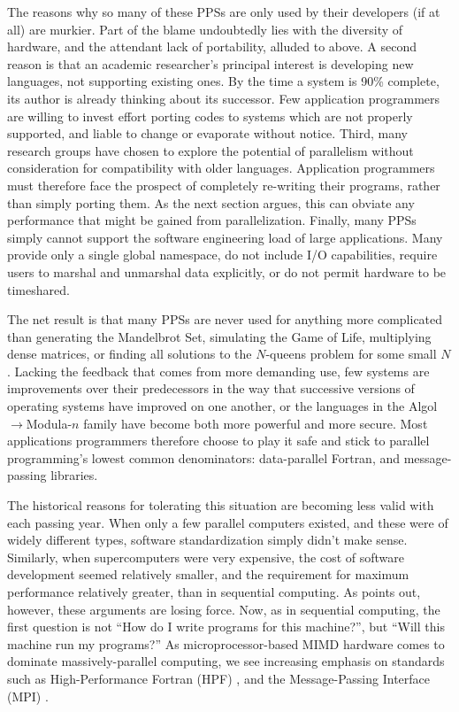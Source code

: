 The reasons why so many of these PPSs are only used by their developers (if at all) are murkier.
Part of the blame undoubtedly lies with the diversity of hardware,
and the attendant lack of portability,
alluded to above.
A second reason is that an academic researcher's principal interest is developing new languages,
not supporting existing ones.
By the time a system is 90\% complete,
its author is already thinking about its successor.
Few application programmers are willing to invest effort porting codes
to systems which are not properly supported,
and liable to change or evaporate without notice.
Third,
many research groups have chosen to explore the potential of parallelism
without consideration for compatibility with older languages.
Application programmers must therefore face the prospect of completely re-writing their programs,
rather than simply porting them.
As the next section argues,
this can obviate any performance that might be gained from parallelization.
Finally,
many PPSs simply cannot support the software engineering load of large applications.
Many provide only a single global namespace,
do not include I/O capabilities,
require users to marshal and unmarshal data explicitly,
or do not permit hardware to be timeshared.

The net result is that many PPSs are never used for anything more complicated than
generating the Mandelbrot Set,
simulating the Game of Life,
multiplying dense matrices,
or finding all solutions to the $N$-queens problem for some small $N$.
Lacking the feedback that comes from more demanding use,
few systems are improvements over their predecessors
in the way that successive versions of operating systems have improved on one another,
or the languages in the Algol$\rightarrow$Modula-$n$ family
have become both more powerful and more secure.
Most applications programmers therefore choose to play it safe
and stick to parallel programming's lowest common denominators:
data-parallel Fortran,
and message-passing libraries.

The historical reasons for tolerating this situation are becoming less valid with each passing year.
When only a few parallel computers existed,
and these were of widely different types,
software standardization simply didn't make sense.
Similarly,
when supercomputers were very expensive,
the cost of software development seemed relatively smaller,
and the requirement for maximum performance relatively greater,
than in sequential computing.
As \cite{b:social-limits-speed} points out,
however, these arguments are losing force.
Now,
as in sequential computing,
the first question is not ``How do I write programs for this machine?'',
but ``Will this machine run my programs?''
As microprocessor-based MIMD hardware comes to dominate massively-parallel computing,
we see increasing emphasis on standards such as High-Performance Fortran (HPF) \cite{b:hpf-overview},
and the Message-Passing Interface (MPI) \cite{b:mpi-overview}.

